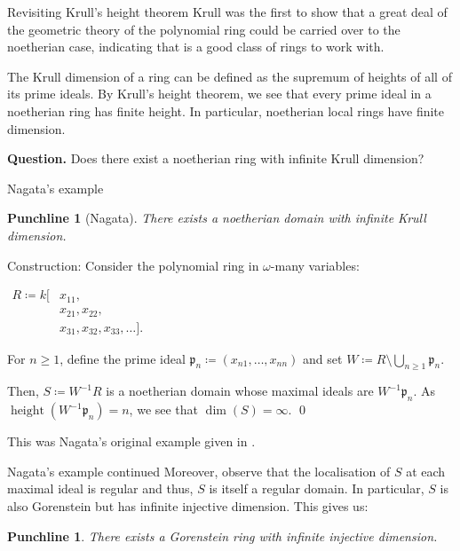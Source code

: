 \documentclass{beamer}
\newtheorem{punchline}[theorem]{Punchline}
\DeclareMathOperator{\htt}{height}
\begin{document}
	\begin{frame}{Revisiting Krull's height theorem}
		Krull was the first to show that a great deal of the geometric theory of the polynomial ring could be carried over to the noetherian case, \pause indicating that is a good class of rings to work with. \pause

		The Krull dimension of a ring can be defined as the supremum of heights of all of its prime ideals. \pause By Krull's height theorem, we see that every prime ideal in a noetherian ring has finite height. \pause In particular, noetherian local rings have finite dimension. \pause

		\textbf{Question.} Does there exist a noetherian ring with infinite Krull dimension?
	\end{frame}

	\begin{frame}{Nagata's example}
		\vphantom{H}

		\begin{punchline}[Nagata]
			There exists a noetherian domain with infinite Krull dimension.
		\end{punchline} 
		\pause
		Construction: Consider the polynomial ring in $\omega$-many variables: \pause
		{\centering
		$
			\begin{aligned}
				R \coloneqq k[&x_{11}, \\
				& x_{21}, x_{22}, \\
				& x_{31}, x_{32}, x_{33}, \ldots]. 
			\end{aligned}
		$
		\par}
		\pause 
		For $n \ge 1$, define the prime ideal $\mathfrak{p}_{n} \coloneqq (x_{n1}, \ldots, x_{nn})$ \pause and set $W \coloneqq R \setminus \bigcup_{n \ge 1} \mathfrak{p}_{n}$. \pause 

		Then, $S \coloneqq W^{-1} R$ is a noetherian domain whose maximal ideals are $W^{-1}\mathfrak{p}_{n}$. \pause As $\htt(W^{-1} \mathfrak{p}_{n}) = n$, we see that $\dim(S) = \infty$. \qed \pause

		{\footnotesize This was Nagata's original example given in \cite[Appendix A1]{NagataLocalRings}.}
	\end{frame}
	\begin{frame}{Nagata's example continued}
		Moreover, observe that the localisation of $S$ at each maximal ideal is regular and thus, $S$ is itself a regular domain. \pause In particular, $S$ is also Gorenstein but has infinite injective dimension. \pause This gives us:

		\begin{punchline}
			There exists a Gorenstein ring with infinite injective dimension.
		\end{punchline} 
	\end{frame}
\end{document}
